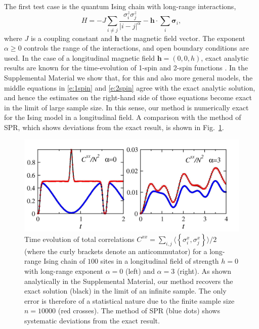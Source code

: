 \documentclass[aps,prl,showpacs,amsmath,amssymb,superscriptaddress,reprint,10pt]{revtex4-1}
\newcommand{\mvec}[1]{\boldsymbol #1}
\begin{document}
The first test case is the quantum Ising chain with long-range interactions,
\begin{equation}\label{e:Ising}
H=-J\sum_{i\neq j}\frac{\sigma_i^z\sigma_j^z}{|i-j|^\alpha} - \mvec{h}\cdot\sum_i\mvec{\sigma}_i,
\end{equation}
where $J$ is a coupling constant and $\mvec{h}$ the magnetic field vector. The exponent $\alpha\geq0$ controls the range of the interactions, and open boundary conditions are used. In the case of a longitudinal magnetic field $\mvec{h}=(0,0,h)$, exact analytic results are known for the time-evolution of 1-spin \cite{Emch66,*Radin70,*Kastner11,*Kastner12} and 2-spin functions \cite{vdWorm_etal13,*FossFeigHazzardBollingerRey13,*KastnerVdWorm}. In the Supplemental Material we show that, for this and also more general models, the middle equations in \eqref{e:1spin} and \eqref{e:2spin} agree with the exact analytic solution, and hence the estimates on the right-hand side of those equations become exact in the limit of large sample size. In this sense, our method is numerically exact for the Ising model in a longitudinal field. A comparison with the method of SPR, which shows deviations from the exact result, is shown in Fig.~\ref{f:Ising}.

\begin{figure}\centering
\includegraphics[width=\linewidth]{./Ising_Schach_N100_alph_0_3_nt10000.jpg}
\caption{\label{f:Ising}%
Time evolution of total correlations $C^{xx}=\sum_{i,j}\langle\left\{\sigma_i^x,\sigma_j^x\right\}\rangle/2$ (where the curly brackets denote an anticommutator) for a long-range Ising chain of $100$ sites in a longitudinal field of strength $h=0$ with long-range exponent $\alpha=0$ (left) and $\alpha=3$ (right). As shown analytically in the Supplemental Material, our method recovers the exact solution (black) in the limit of an infinite sample. The only error is therefore of a statistical nature due to the finite sample size $n=10000$ (red crosses). The method of SPR (blue dots) shows systematic deviations from the exact result.
}%
\end{figure}
\end{document}
